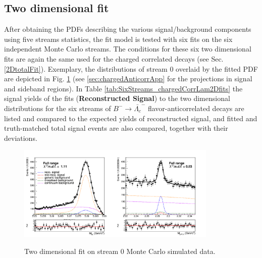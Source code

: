 \subsection{Two dimensional fit}\label{sec:chargedAnticorr2DtotalFit}
After obtaining the PDFs describing the various signal/background components using five streams statistics, the fit model is tested with six fits on the six independent Monte Carlo streams. The conditions for these six two dimensional fits are again the same used for the charged correlated decays (see Sec. \ref{2DtotalFit}).
\noindent Exemplary, the distributions of stream 0 overlaid by the fitted PDF are depicted in Fig. \ref{fig:Total_2DFit_stream0_chargedAnticorrLambdaC_Crossfeed_fraction} (see \cref{sec:chargedAnticorrApp}                       
for the projections in signal and sideband regions). 
In Table \ref{tab:SixStreams_chargedCorrLam2Dfits} the signal yields of the fits (\textbf{Reconstructed Signal}) to the two dimensional distributions for the six streams of $B^- \rightarrow \bar{\Lambda_c}^-$ flavor-anticorrelated decays are listed and compared to the expected yields of reconstructed signal, and fitted and truth-matched total signal events are also compared, together with their deviations.

\begin{figure}[H]
\centering
{\includegraphics[width=0.85\textwidth]{06-chargedAnticorrBtoLambda/figs/Total_2DFit_stream0_chargedAnticorrLambdaC_Crossfeed_fraction_parametrization.png}}
\caption{Two dimensional fit on stream 0 Monte Carlo simulated data.}
\label{fig:Total_2DFit_stream0_chargedAnticorrLambdaC_Crossfeed_fraction}
\end{figure}

